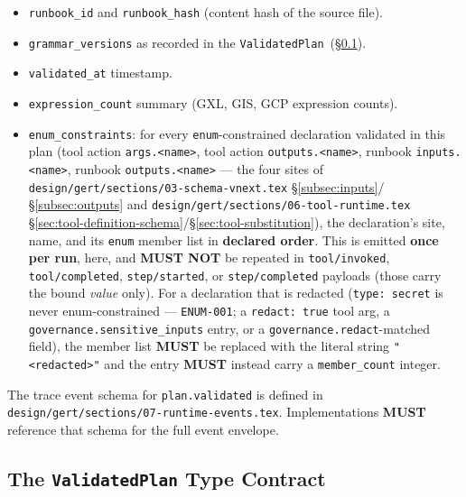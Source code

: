 \begin{itemize}
  \item \texttt{runbook\_id} and \texttt{runbook\_hash} (content hash of the
    source file).
  \item \texttt{grammar\_versions} as recorded in the
    \texttt{ValidatedPlan}~(\S\ref{sec:parse-gate:validated-plan}).
  \item \texttt{validated\_at} timestamp.
  \item \texttt{expression\_count} summary (GXL, GIS, GCP expression counts).
  \item \texttt{enum\_constraints}: for every \texttt{enum}-constrained
    declaration validated in this plan (tool action \texttt{args.<name>},
    tool action \texttt{outputs.<name>}, runbook \texttt{inputs.<name>},
    runbook \texttt{outputs.<name>} --- the four sites of
    \texttt{design/gert/sections/03-schema-vnext.tex}
    \S\ref{subsec:inputs}/\S\ref{subsec:outputs} and
    \texttt{design/gert/sections/06-tool-runtime.tex}
    \S\ref{sec:tool-definition-schema}/\S\ref{sec:tool-substitution}), the
    declaration's site, name, and its \texttt{enum} member list in
    \textbf{declared order}. This is emitted \textbf{once per run}, here,
    and \textbf{MUST NOT} be repeated in \texttt{tool/invoked},
    \texttt{tool/completed}, \texttt{step/started}, or
    \texttt{step/completed} payloads (those carry the bound \emph{value}
    only). For a declaration that is redacted (\texttt{type: secret} is
    never enum-constrained --- \texttt{ENUM-001}; a \texttt{redact: true}
    tool arg, a \texttt{governance.sensitive\_inputs} entry, or a
    \texttt{governance.redact}-matched field), the member list \textbf{MUST}
    be replaced with the literal string \texttt{"<redacted>"} and the entry
    \textbf{MUST} instead carry a \texttt{member\_count} integer.
\end{itemize}

The trace event schema for \texttt{plan.validated} is defined in
\texttt{design/gert/sections/07-runtime-events.tex}.  Implementations \textbf{MUST}
reference that schema for the full event envelope.

\subsection{The \texttt{ValidatedPlan} Type Contract}
\label{sec:parse-gate:validated-plan}

